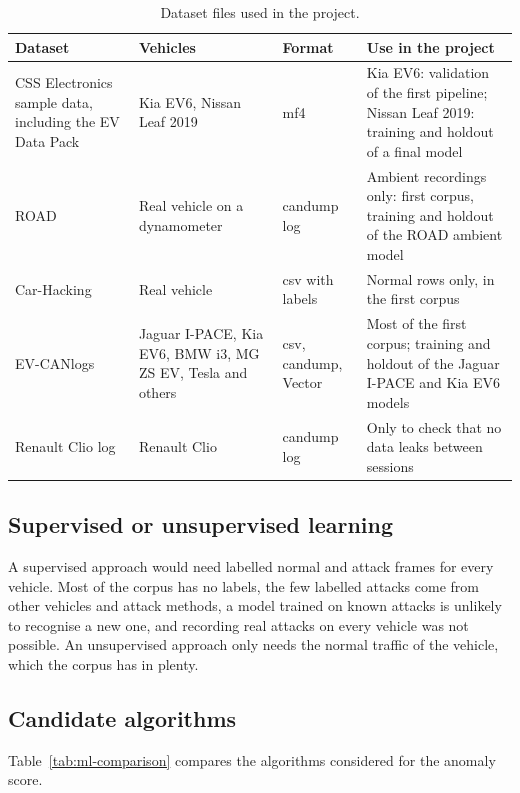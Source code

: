 \begin{table}[H]
\centering
\small
\caption{Dataset files used in the project.}
\label{tab:datasets}
\begin{tabularx}{\textwidth}{|P{2.7cm}|P{3.1cm}|P{2.0cm}|Y|}
\hline
\textbf{Dataset} & \textbf{Vehicles} & \textbf{Format} & \textbf{Use in the project} \\
\hline
CSS Electronics sample data, including the EV Data Pack~\cite{css_evdata} & Kia EV6, Nissan Leaf 2019 & \gls{mf4} & Kia EV6: validation of the first pipeline; Nissan Leaf 2019: training and holdout of a final model \\
\hline
ROAD~\cite{verma2020road} & Real vehicle on a dynamometer & candump log & Ambient recordings only: first corpus, training and holdout of the ROAD ambient model \\
\hline
Car-Hacking~\cite{seo2018gids} & Real vehicle & \gls{csv} with labels & Normal rows only, in the first corpus \\
\hline
EV-CANlogs~\cite{evcanlogs} & Jaguar I-PACE, Kia EV6, BMW i3, MG ZS EV, Tesla and others & \gls{csv}, candump, Vector & Most of the first corpus; training and holdout of the Jaguar I-PACE and Kia EV6 models \\
\hline
Renault Clio log & Renault Clio & candump log & Only to check that no data leaks between sessions \\
\hline
\end{tabularx}
\end{table}

\subsection{Supervised or unsupervised learning}

A supervised approach would need labelled normal and attack frames for every vehicle. Most of the corpus has no labels, the few labelled attacks come from other vehicles and attack methods, a model trained on known attacks is unlikely to recognise a new one, and recording real attacks on every vehicle was not possible. An unsupervised approach only needs the normal traffic of the vehicle, which the corpus has in plenty.

\subsection{Candidate algorithms}
\label{sec:ml-selection}

Table~\ref{tab:ml-comparison} compares the algorithms considered for the anomaly score.

